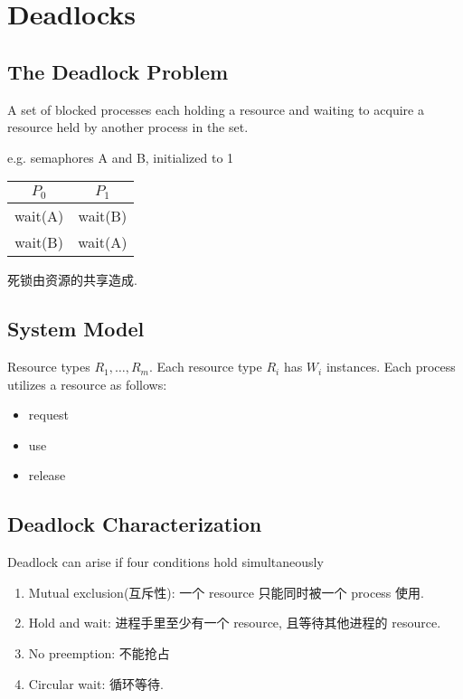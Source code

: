 \newpage
\section{Deadlocks}
\subsection{The Deadlock Problem}
A set of blocked processes each holding a resource and waiting to acquire a resource held by another process in the set.

e.g. semaphores A and B, initialized to 1 
\begin{table}[!htb]
    \centering
    \begin{tabular}[c]{cc}\toprule
         $P_0$ & $P_1$\\ \midrule
         wait(A) & wait(B) \\
         wait(B) & wait(A) \\
        \bottomrule
    \end{tabular}
\end{table}

死锁由资源的共享造成. 

\subsection{System Model}
Resource types $R_1,\dots,R_m$. Each resource type $R_i$ has $W_i$ instances. Each process utilizes a resource as follows:
\begin{itemize}
    \item request
    \item use
    \item release
\end{itemize}

\subsection{Deadlock Characterization}
Deadlock can arise if four conditions hold simultaneously
\begin{enumerate}
    \item Mutual exclusion(互斥性): 一个 resource 只能同时被一个 process 使用. 
    \item Hold and wait: 进程手里至少有一个 resource, 且等待其他进程的 resource. 
    \item No preemption: 不能抢占
    \item Circular wait: 循环等待. 
\end{enumerate}

